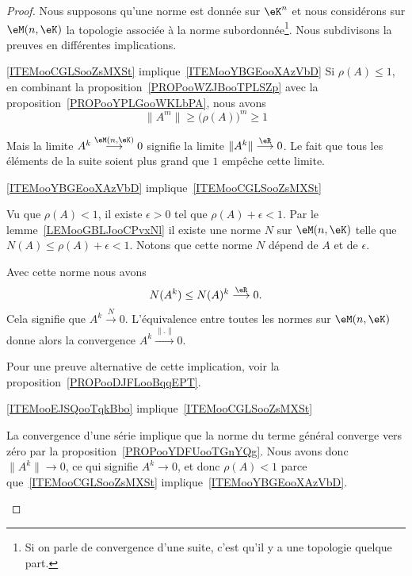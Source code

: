 \begin{proof}
    Nous supposons qu'une norme est donnée sur \( \eK^n\) et nous considérons sur \( \eM(n,\eK)\) la topologie associée à la norme subordonnée\footnote{Si on parle de convergence d'une suite, c'est qu'il y a une topologie quelque part.}. Nous subdivisons la preuves en différentes implications.
    \begin{subproof}
        \item[\ref{ITEMooCGLSooZsMXSt} implique~\ref{ITEMooYBGEooXAzVbD}]
            Si \( \rho(A)\leq 1\), en combinant la proposition~\ref{PROPooWZJBooTPLSZp} avec la proposition~\ref{PROPooYPLGooWKLbPA}, nous avons
            \begin{equation}
                \| A^m \|\geq \big( \rho(A) \big)^m\geq 1
            \end{equation}

            Mais la limite \( A^k\stackrel{\eM(n,\eK)}{\longrightarrow} 0\) signifie la limite \( \| A^k \|\stackrel{\eR}{\longrightarrow}0\). Le fait que tous les éléments de la suite soient plus grand que \( 1\) empêche cette limite.
        \item[\ref{ITEMooYBGEooXAzVbD} implique~\ref{ITEMooCGLSooZsMXSt}]

            Vu que \( \rho(A)<1\), il existe \( \epsilon>0\) tel que \( \rho(A)+\epsilon<1\). Par le lemme~\ref{LEMooGBLJooCPvxNl} il existe une norme \( N\) sur \( \eM(n,\eK)\) telle que \( N(A)\leq \rho(A)+\epsilon<1\). Notons que cette norme \( N\) dépend de \( A\) et de \( \epsilon\).

            Avec cette norme nous avons
            \begin{equation}
                N(A^k)\leq N(A)^k\stackrel{\eR}{\longrightarrow}0.
            \end{equation}
            Cela signifie que \( A^k\stackrel{N}{\longrightarrow}0\). L'équivalence entre toutes les normes sur \( \eM(n,\eK)\) donne alors la convergence \( A^k\stackrel{\| . \|}{\longrightarrow}0\).

            Pour une preuve alternative de cette implication, voir la proposition~\ref{PROPooDJFLooBqqEPT}.

        \item[\ref{ITEMooEJSQooTqkBbo} implique~\ref{ITEMooCGLSooZsMXSt}]

            La convergence d'une série implique que la norme du terme général converge vers zéro par la proposition~\ref{PROPooYDFUooTGnYQg}. Nous avons donc \( \| A^k \|\to 0\), ce qui signifie \( A^k\to 0\), et donc \( \rho(A)<1\) parce que~\ref{ITEMooCGLSooZsMXSt} implique~\ref{ITEMooYBGEooXAzVbD}.


\end{subproof}
\end{proof}
